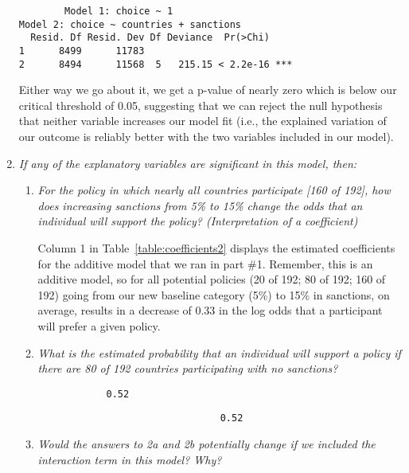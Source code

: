 \documentclass[12pt,letterpaper]{article}
\begin{document}
\begin{enumerate}
	\begin{verbatim}
		Model 1: choice ~ 1
Model 2: choice ~ countries + sanctions
  Resid. Df Resid. Dev Df Deviance  Pr(>Chi)    
1      8499      11783                          
2      8494      11568  5   215.15 < 2.2e-16 ***
	\end{verbatim}
	
	Either way we go about it, we get a p-value of nearly zero which is below our critical threshold of 0.05, suggesting that we can reject the null hypothesis that neither variable increases our model fit (i.e., the explained variation of our outcome is reliably better with the two variables included in our model).
		
	\item
	\textit{If any of the explanatory variables are significant in this model, then:}
	\begin{enumerate}
		\item
		\textit{For the policy in which nearly all countries participate [160 of 192], how does increasing sanctions from 5\% to 15\% change the odds that an individual will support the policy? (Interpretation of a coefficient)}
		
		Column 1 in Table~\ref{table:coefficients2} displays the estimated coefficients for the additive model that we ran in part \#1. Remember, this is an additive model, so for all potential policies (20 of 192; 80 of 192; 160 of 192) going from our new baseline category (5\%)  to 15\% in sanctions, on average, results in a decrease of 0.33 in the log odds that a participant will prefer a given policy.
		
		\item
		\textit{What is the estimated probability that an individual will support a policy if there are 80 of 192 countries participating with no sanctions? }
		
			 
			
			\begin{verbatim}
			0.52
			\end{verbatim}
			
						 
						
						\begin{verbatim}
								0.52 
						\end{verbatim}
		
		\item
		\textit{Would the answers to 2a and 2b potentially change if we included the interaction term in this model? Why? }
		

\end{enumerate}
\end{enumerate}
\end{document}
